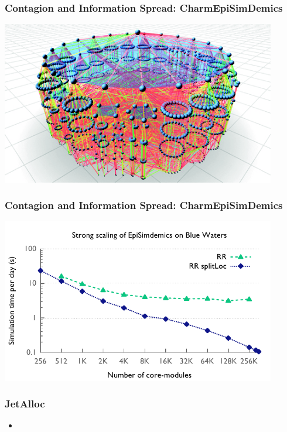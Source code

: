 \begin{frame}
\frametitle{Contagion and Information Spread: CharmEpiSimDemics}
\includegraphics[width=0.9\textwidth]{../figures/contagion.png}
\end{frame}


\begin{frame}
\frametitle{Contagion and Information Spread: CharmEpiSimDemics}
\includegraphics[width=0.9\textwidth]{../figures/simdemics_strong_scaling.pdf}
\end{frame}


\begin{frame}
\frametitle{JetAlloc}
%
\begin{itemize}
\item
\end{itemize}
%
\end{frame}

